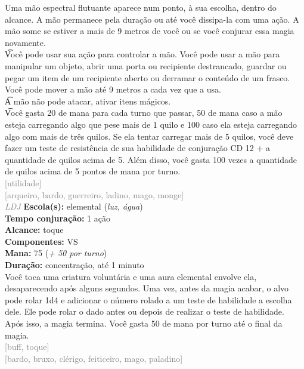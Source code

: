\documentclass{RPG_Adventure}[2021/10/20]
\begin{document}
{\normalsize Uma mão espectral flutuante aparece num ponto, à sua escolha, dentro do alcance. A mão permanece pela duração ou até você dissipa-la com uma ação. A mão some se estiver a mais de 9 metros de você ou se você conjurar essa magia novamente.\\\t Você pode usar sua ação para controlar a mão. Você pode usar a mão para manipular um objeto, abrir uma porta ou recipiente destrancado, guardar ou pegar um item de um recipiente aberto ou derramar o conteúdo de um frasco. Você pode mover a mão até 9 metros a cada vez que a usa.\\\t A mão não pode atacar, ativar itens mágicos.\\\t Você gasta 20 de mana para cada turno que passar, 50 de mana caso a mão esteja carregando algo que pese mais de 1 quilo e 100 caso ela esteja carregando algo com mais de três quilos. Se ela tentar carregar mais de 5 quilos, você deve fazer um teste de resistência de sua habilidade de conjuração CD 12 + a quantidade de quilos acima de 5. Além disso, você gasta 100 vezes a quantidade de quilos acima de 5 pontos de mana por turno.\\}
{\scriptsize \textcolor{gray}{[utilidade]\\}}
{\scriptsize \textcolor{gray}{[arqueiro, bardo, guerreiro, ladino, mago, monge]\\}}
{\tiny \textcolor{gray}{\textit{LDJ}}}
{\small \t \textbf{Escola(s):} elemental (\textit{luz, água})\\\t \textbf{Tempo conjuração:} 1 ação\\\t \textbf{Alcance:} toque\\\t \textbf{Componentes:} VS\\\t \textbf{Mana:} 75 (\textit{+ 50 por turno})\\\t \textbf{Duração:} concentração, até 1 minuto\\}
{\normalsize Você toca uma criatura voluntária e uma aura elemental envolve ela, desaparecendo após alguns segundos. Uma vez, antes da magia acabar, o alvo pode rolar 1d4 e adicionar o número rolado a um teste de habilidade a escolha dele. Ele pode rolar o dado antes ou depois de realizar o teste de habilidade. Após isso, a magia termina. Você gasta 50 de mana por turno até o final da magia.\\}
{\scriptsize \textcolor{gray}{[buff, toque]\\}}
{\scriptsize \textcolor{gray}{[bardo, bruxo, clérigo, feiticeiro, mago, paladino]\\}}
\end{document}
